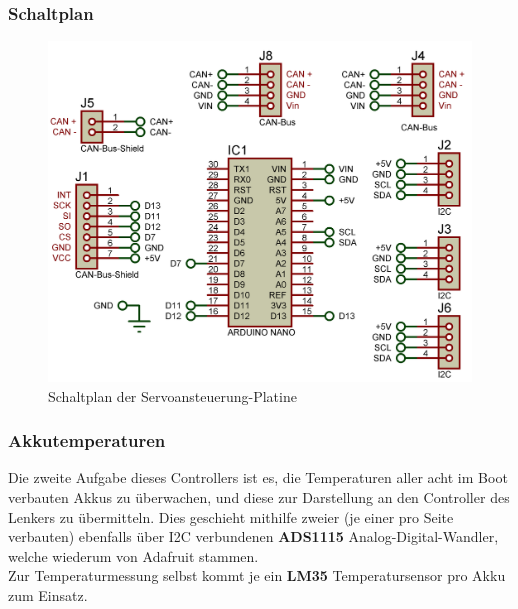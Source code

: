 \newpage
\subsubsection{Schaltplan}
\begin{figure}[h]
    \centering
    \includegraphics[width=1.0\textwidth]{../Proteus/Exports/Servos-Platine.png}    
    \caption{Schaltplan der Servoansteuerung-Platine}
\end{figure}


\newpage
\subsubsection{Akkutemperaturen}
Die zweite Aufgabe dieses Controllers ist es, die Temperaturen aller acht im Boot verbauten Akkus zu überwachen, und diese zur Darstellung an den Controller des Lenkers zu übermitteln.
Dies geschieht mithilfe zweier (je einer pro Seite verbauten) ebenfalls über I2C verbundenen \textbf{ADS1115} Analog-Digital-Wandler, welche wiederum von Adafruit stammen.\\
Zur Temperaturmessung selbst kommt je ein \textbf{LM35} Temperatursensor pro Akku zum Einsatz.\\

